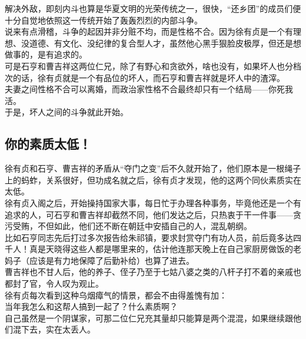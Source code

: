	\begin{multicols}{\theparacolNo}
\fi
解决外敌，即刻内斗也算是华夏文明的光荣传统之一，很快，“还乡团”的成员们便十分自觉地依照这一传统开始了轰轰烈烈的内部斗争。\\

说来有点滑稽，斗争的起因并非分赃不均，而是性格不合。因为徐有贞是一个有理想、没道德、有文化、没纪律的复合型人才，虽然他心黑手狠脸皮极厚，但还是想做事的，是有追求的。\\

可是石亨和曹吉祥这两位仁兄，除了有野心和贪欲外，啥也没有，如果坏人也分档次的话，徐有贞就是一个有品位的坏人，而石亨和曹吉祥就是坏人中的渣滓。\\

夫妻之间性格不合可以离婚，而政治家性格不合最终却只有一个结局——你死我活。\\

于是，坏人之间的斗争就此开始。\\

\subsection{你的素质太低！}
徐有贞和石亨、曹吉祥的矛盾从“夺门之变”后不久就开始了，他们原本是一根绳子上的蚂蚱，关系很好，但功成名就之后，徐有贞才发现，他的这两个同伙素质实在太低。\\

徐有贞入阁之后，开始操持国家大事，每日忙于办理各种事务，毕竟他还是一个有追求的人，可石亨和曹吉祥却截然不同，他们发达之后，只热衷于干一件事——贪污受贿，不但如此，他们还不断在朝廷中安插自己的人，混乱朝纲。\\

比如石亨同志先后打过多次报告给朱祁镇，要求封赏夺门有功人员，前后竟多达四千人！真是天晓得这些人都是哪里来的，估计他连那天晚上在自己家厨房做饭的老妈子（应该是有力地保障了后勤补给）也算了进去。\\

曹吉祥也不甘人后，他的养子、侄子乃至于七姑八婆之类的八杆子打不着的亲戚也都封了官，令人叹为观止。\\

徐有贞每次看到这种乌烟瘴气的情景，都会不由得羞愧有加：\\

当年我怎么和这帮人搞到一起了？什么素质啊？\\

自己虽然是一个阴谋家，可那二位仁兄充其量却只能算是两个混混，如果继续跟他们混下去，实在太丢人。\\


\end{multicols}
